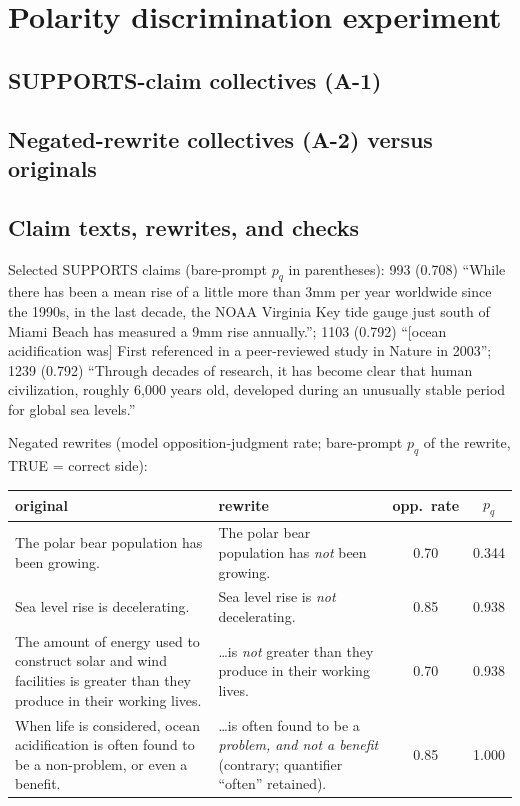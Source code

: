 \documentclass[11pt]{article}
\begin{document}
\section{Polarity discrimination experiment}

\subsection{SUPPORTS-claim collectives (A-1)}
\begin{center}

\end{center}

\subsection{Negated-rewrite collectives (A-2) versus originals}
\begin{center}
\small

\end{center}

\subsection{Claim texts, rewrites, and checks}

Selected SUPPORTS claims (bare-prompt $p_q$ in parentheses): 993 (0.708)
``While there has been a mean rise of a little more than 3mm per year
worldwide since the 1990s, in the last decade, the NOAA Virginia Key tide
gauge just south of Miami Beach has measured a 9mm rise annually.''; 1103
(0.792) ``[ocean acidification was] First referenced in a peer-reviewed study
in Nature in 2003''; 1239 (0.792) ``Through decades of research, it has
become clear that human civilization, roughly 6,000 years old, developed
during an unusually stable period for global sea levels.''

Negated rewrites (model opposition-judgment rate; bare-prompt $p_q$ of the
rewrite, TRUE = correct side):

\begin{center}
\small
\begin{tabular}{p{5.6cm}p{5.6cm}cc}
\toprule
original & rewrite & opp.\ rate & $p_q$ \\
\midrule
The polar bear population has been growing. &
The polar bear population has \emph{not} been growing. & 0.70 & 0.344 \\
Sea level rise is decelerating. &
Sea level rise is \emph{not} decelerating. & 0.85 & 0.938 \\
The amount of energy used to construct solar and wind facilities is greater
than they produce in their working lives. &
\ldots is \emph{not} greater than they produce in their working lives. &
0.70 & 0.938 \\
When life is considered, ocean acidification is often found to be a
non-problem, or even a benefit. &
\ldots is often found to be a \emph{problem, and not a benefit}
(contrary; quantifier ``often'' retained). & 0.85 & 1.000 \\
\bottomrule
\end{tabular}
\end{center}
\end{document}
